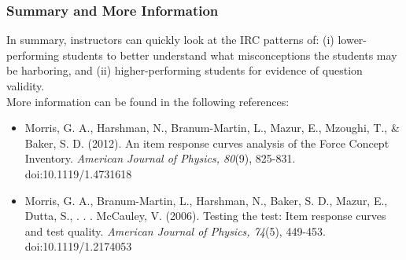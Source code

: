 \documentclass[11pt,letterpaper]{article}\usepackage[]{graphicx}\usepackage[]{color}
\begin{document}
\subsubsection*{Summary and More Information} 
In summary, instructors can quickly look at the IRC patterns of: (i) lower-performing students to better understand what misconceptions the students may be harboring, and (ii) higher-performing students for evidence of question validity.  \\

\noindent More information can be found in the following references:
\begin{footnotesize}
	\begin{itemize}
	  \item Morris, G. A., Harshman, N., Branum-Martin, L., Mazur, E., Mzoughi, T., \& Baker, S. D. (2012). An item response curves analysis of the Force Concept Inventory. \textit{American Journal of Physics, 80}(9), 825-831. doi:10.1119/1.4731618
	  \item Morris, G. A., Branum-Martin, L., Harshman, N., Baker, S. D., Mazur, E., Dutta, S., . . . McCauley, V. (2006). Testing the test: Item response curves and test quality. \textit{American Journal of Physics, 74}(5), 449-453. doi:10.1119/1.2174053
	\end{itemize}
\end{footnotesize}

\end{document}
